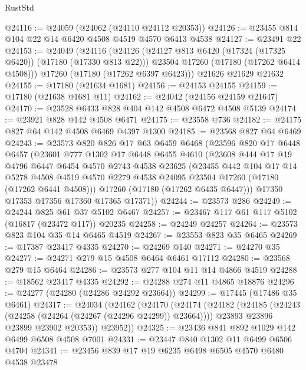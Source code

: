 \begin{lexlean}{RustStd}
\begin{coremodule}
{\begin{coremodule}
{{{{{{{{{{{{{{{{{{{{{{{{{{{{{{{{{{{{{{{{{{{{{{{{{{{{{{{@24116 := @24059 (@24062 (@24110 @24112 @20353))
@24126 := @23455 @814 @104 @22 @14 @6420 @4508 @4519 @4570 @6413 @4538
@24127 := @23491 @22
@24153 := @24049
    (@24116
      (@24126
        (@24127 @813 @6420 (@17324 (@17325 @6420)) (@17180 (@17330 @813 @22)))
        @23504
        @17260
        (@17180 (@17262 @6414 @4508)))
      @17260
      (@17180 (@17262 @6397 @6423)))
    @21626
    @21629
    @21632
@24155 := @17180 (@21634 @1681)
@24156 := @24153 @24155
@24159 := @17180 (@21638 @1681 @11)
@24162 := @24042 (@24156 @24159 @21647)
@24170 := @23528 @6433 @828 @404 @142 @4508 @6472 @4508 @5139
@24174 := @23921 @828 @142 @4508 @6471
@24175 := @23558 @736
@24182 := @24175 @827 @64 @142 @4508 @6469 @4397 @1300
@24185 := @23568 @827 @64 @6469
@24243 := @23573
    @820
    @826
    @17
    @63
    @6459
    @6468
    (@23596
      @820
      @17
      @6448
      @6457
      (@23601
        @777
        @1302
        @17
        @6448
        @6455
        @4610
        (@23608
          @444
          @17
          @19
          @4796
          @6447
          @6454
          @4570
          @2743
          @4538
          @23625
          (@23455
            @442
            @104
            @17
            @14
            @5278
            @4508
            @4519
            @4570
            @2279
            @4538
            @24095
            @23504
            @17260
            (@17180 (@17262 @6441 @4508)))
          @17260
          (@17180 (@17262 @6435 @6447)))
        @17350
        @17353
        @17356
        @17360
        @17365
        @17371))
@24244 := @23573 @286
@24249 := @24244 @825 @61 @37 @5102 @6467
@24257 := @23467 @117 @61 @117 @5102 (@16817 (@23472 @117)) @20235
@24258 := @24249 @24257
@24264 := @23573 @823 @104 @35 @14 @6465 @4519
@24267 := @23553 @823 @35 @6465
@24269 := @17387 @23417 @4335
@24270 := @24269 @140
@24271 := @24270 @35
@24277 := @24271 @279 @15 @4508 @6464 @6461 @17112
@24280 := @23568 @279 @15 @6464
@24286 := @23573 @277 @104 @11 @14 @4866 @4519
@24288 := @18562 @23417 @4335
@24292 := @24288 @274 @11 @4865 @18876
@24296 := @24277 (@24280 (@24286 @24292 @23664))
@24299 := @17445 (@17486 @35 @6461)
@24317 := @24034
    (@24162
      (@24170
        (@24174
          (@24182
            (@24185 (@24243 (@24258 (@24264 (@24267 (@24296 @24299)) @23664))))
            @23893
            @23896
            @23899
            @23902
            @20353))
        @23952))
@24325 := @23436 @841 @892 @1029 @142 @6499 @6508 @4508 @7001
@24331 := @23447 @840 @1302 @11 @6499 @6506 @4704
@24341 := @23456 @839 @17 @19 @6235 @6498 @6505 @4570 @6480 @4538 @23478
}}}}}}}}}}}}}}}}}}}}}}}}}}}}}}}}}}}}}}}}}}}}}}}}}}}}}}}
\end{coremodule}}
\end{coremodule}
\end{lexlean}
